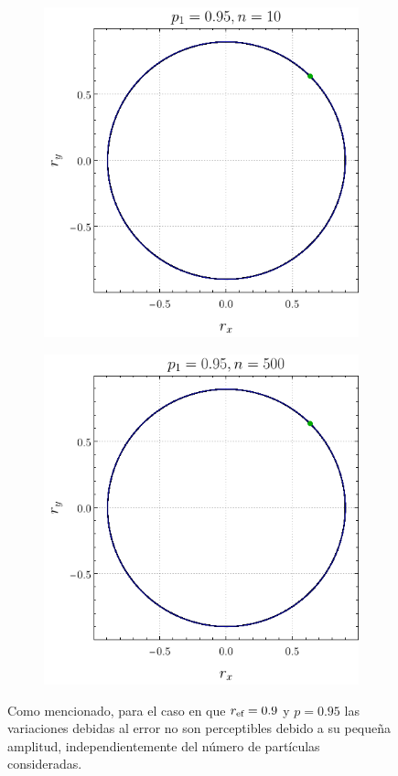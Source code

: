 \begin{figure}[ht!]
    \centering
    \begin{subfigure}{0.5\textwidth}
      \centering
      \includegraphics[width=0.9\linewidth]{chapter3/figures_separable/local_all_ran_p=0.95_r=0.9_n=10_a=-3_b=3.png}
    \end{subfigure}%
    \begin{subfigure}{0.5\textwidth}
      \centering
      \includegraphics[width=0.9\linewidth]{chapter3/figures_separable/local_all_ran_p=0.95_r=0.9_n=500_a=-3_b=3.png}
    \end{subfigure}
    \caption{Como mencionado, para el caso en que $r_{\text{ef}}=0.9$ y $p=0.95$ las variaciones debidas al error no son perceptibles debido a su pequeña amplitud, independientemente del número de partículas consideradas.}\label{fig:Oscilations12}
\end{figure}
